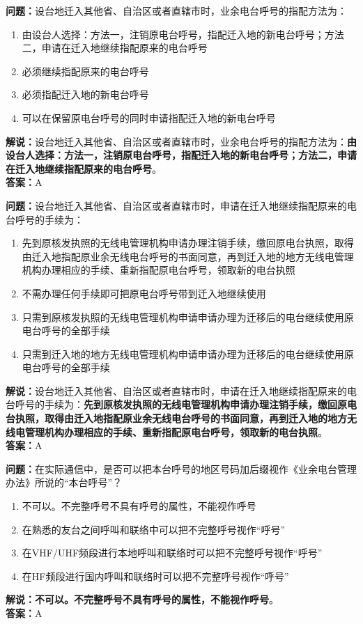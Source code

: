 \textbf{问题：}设台地迁入其他省、自治区或者直辖市时，业余电台呼号的指配方法为：
\begin{enumerate}[label=\Alph*), leftmargin=1cm]
	\item 由设台人选择：方法一，注销原电台呼号，指配迁入地的新电台呼号；方法二，申请在迁入地继续指配原来的电台呼号
	\item 必须继续指配原来的电台呼号
	\item 必须指配迁入地的新电台呼号
	\item 可以在保留原电台呼号的同时申请指配迁入地的新电台呼号
\end{enumerate}
\textbf{解说：}设台地迁入其他省、自治区或者直辖市时，业余电台呼号的指配方法为：\textbf{由设台人选择：方法一，注销原电台呼号，指配迁入地的新电台呼号；方法二，申请在迁入地继续指配原来的电台呼号}。\\\textbf{答案：}A%

\textbf{问题：}设台地迁入其他省、自治区或者直辖市时，申请在迁入地继续指配原来的电台呼号的手续为：
\begin{enumerate}[label=\Alph*), leftmargin=1cm]
	\item 先到原核发执照的无线电管理机构申请办理注销手续，缴回原电台执照，取得由迁入地指配原业余无线电台呼号的书面同意，再到迁入地的地方无线电管理机构办理相应的手续、重新指配原电台呼号，领取新的电台执照
	\item 不需办理任何手续即可把原电台呼号带到迁入地继续使用
	\item 只需到原核发执照的无线电管理机构申请申请办理为迁移后的电台继续使用原电台呼号的全部手续
	\item 只需到迁入地的地方无线电管理机构申请申请办理为迁移后的电台继续使用原电台呼号的全部手续
\end{enumerate}
\textbf{解说：}设台地迁入其他省、自治区或者直辖市时，申请在迁入地继续指配原来的电台呼号的手续为：\textbf{先到原核发执照的无线电管理机构申请办理注销手续，缴回原电台执照，取得由迁入地指配原业余无线电台呼号的书面同意，再到迁入地的地方无线电管理机构办理相应的手续、重新指配原电台呼号，领取新的电台执照}。\\\textbf{答案：}A%

\textbf{问题：}在实际通信中，是否可以把本台呼号的地区号码加后缀视作《业余电台管理办法》所说的“本台呼号”？
\begin{enumerate}[label=\Alph*), leftmargin=1cm]
	\item 不可以。不完整呼号不具有呼号的属性，不能视作呼号
	\item 在熟悉的友台之间呼叫和联络中可以把不完整呼号视作“呼号”
	\item 在VHF/UHF频段进行本地呼叫和联络时可以把不完整呼号视作“呼号”
	\item 在HF频段进行国内呼叫和联络时可以把不完整呼号视作“呼号”
\end{enumerate}
\textbf{解说：不可以。不完整呼号不具有呼号的属性，不能视作呼号}。\\\textbf{答案：}A%

